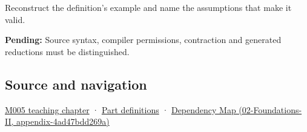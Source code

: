 Reconstruct the definition's example and name the assumptions that make it valid.

\textbf{Pending:} Source syntax, compiler permissions, contraction and generated reductions must be distinguished.

\subsection{Source and navigation}\label{source-and-navigation}

\href{Continuous\%20Notes/Computing\%20Foundations\%20-\%20From\%20Bits\%20to\%20C++\%20and\%20Systems\%20APIs\#When\%20arithmetic\%20meets\%20uncertainty}{M005 teaching chapter} · \hyperref[appendix-fd090d982a15]{Part definitions} · \href{}{Dependency Map (02-Foundations-II, appendix-4ad47bdd269a)}
